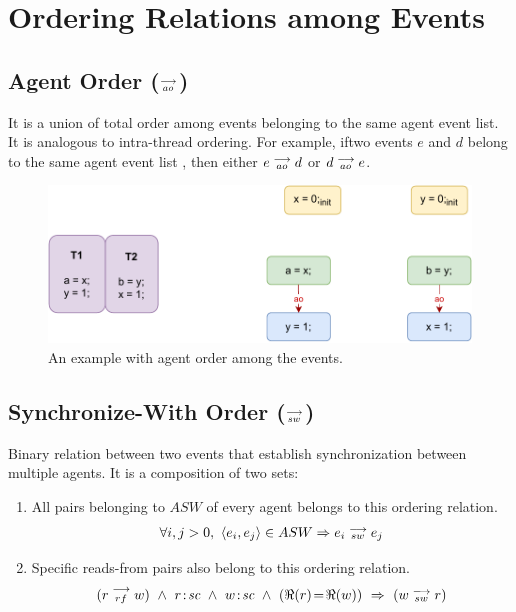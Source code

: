 \section{Ordering Relations among Events}
        
    \subsection{Agent Order ($\stackrel{\longrightarrow}{_{ao}}$)}
        It is a union of total order among events belonging to the same agent event list. It is analogous to intra-thread ordering. For example, iftwo events $e$ and $d$ belong to the same agent event list , then either $e\stackrel{\longrightarrow}{_{ao}}d$ or $d\stackrel{\longrightarrow}{_{ao}}e$. 
        
        \begin{figure}[H]
            \centering
            \includegraphics[scale=0.7]{4.ECMAScriptMemoryModel/AgentOrder.pdf}
            \caption{An example with agent order among the events.}
        \end{figure}
    
    \subsection{Synchronize-With Order ($\stackrel{\longrightarrow}{_{sw}} $)}
       Binary relation between two events that establish synchronization between multiple agents. It is a composition of two sets: 
        \begin{enumerate}
            \item All pairs belonging to $ASW$ of every agent belongs to this ordering relation. 
                \begin{align*}
                    \forall{i, j > 0}, \ \langle e_i, e_j \rangle \in ASW \Rightarrow{} e_i\stackrel{\longrightarrow}{_{sw}}e_j 
                \end{align*}
                    
            \item Specific reads-from pairs also belong to this ordering relation\footnotemark. 
                \begin{align*}
                    (\reln{r}{rf}{w}) \ \wedge \ \et{r}{sc} \ \wedge \ \et{w}{sc} \ \wedge \ (\Re(r)\!=\!\Re(w)) \ \Rightarrow{} \
                    (\reln{w}{sw}{r})
                \end{align*}
                    
        \end{enumerate}
        
